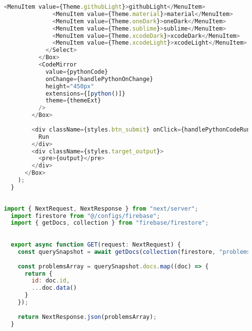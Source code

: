 \begin{lstlisting}[language=JavaScript, frame=single, caption={Codemirror буюу @uiw/react-codemirror-ийн компонентийг ашиглаж буй байдал}]
              <MenuItem value={Theme.githubLight}>githubLight</MenuItem>
              <MenuItem value={Theme.material}>material</MenuItem>
              <MenuItem value={Theme.oneDark}>oneDark</MenuItem>
              <MenuItem value={Theme.sublime}>sublime</MenuItem>
              <MenuItem value={Theme.xcodeDark}>xcodeDark</MenuItem>
              <MenuItem value={Theme.xcodeLight}>xcodeLight</MenuItem>
            </Select>
          </Box>
          <CodeMirror
            value={pythonCode}
            onChange={handlePythonOnChange}
            height="450px"
            extensions={[python()]}
            theme={themeExt}
          />
        </Box>
  
        <div className={styles.btn_submit} onClick={handlePythonCodeRun}>
          Run
        </div>
        <div className={styles.target_output}>
          <pre>{output}</pre>
        </div>
      </Box>
    );
  }
  
\end{lstlisting}

\begin{lstlisting}[language=JavaScript, frame=single, caption={NEXTjs бодлогууд авах серверийн endpoint}]
  import { NextRequest, NextResponse } from "next/server";
  import firestore from "@/configs/firebase";
  import { getDocs, collection } from "firebase/firestore";
  
  
  export async function GET(request: NextRequest) {
    const querySnapshot = await getDocs(collection(firestore, "problems"));
  
    const problemsArray = querySnapshot.docs.map((doc) => {
      return {
        id: doc.id,
        ...doc.data()
      }
    });
  
    return NextResponse.json(problemsArray);
  }
\end{lstlisting}

